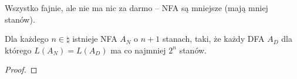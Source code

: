 Wszystko fajnie, ale nie ma nic za darmo -- NFA są mniejsze (mają mniej stanów).
\begin{lemma}
    Dla każdego \( n \in \natural \) istnieje NFA \( A_N \) o \(n + 1\) stanach, taki, że każdy DFA \( A_D \) dla którego \( L(A_N) = L(A_D) \) ma co najmniej \( 2^n \) stanów.
\end{lemma}
\begin{proof}
    
\end{proof}